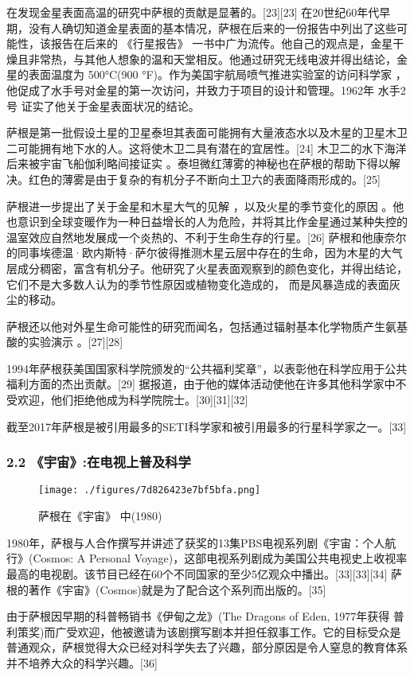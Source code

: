 在发现金星表面高温的研究中萨根的贡献是显著的。[23][23] 在20世纪60年代早期，没有人确切知道金星表面的基本情况，萨根在后来的一份报告中列出了这些可能性，该报告在后来的 《行星报告》 一书中广为流传。他自己的观点是，金星干燥且非常热，与其他人想象的温和天堂相反。他通过研究无线电波并得出结论，金星的表面温度为 500°C(900 °F)。作为美国宇航局喷气推进实验室的访问科学家 ，他促成了水手号对金星的第一次访问，并致力于项目的设计和管理。1962年 水手2号 证实了他关于金星表面状况的结论。

萨根是第一批假设土星的卫星泰坦其表面可能拥有大量液态水以及木星的卫星木卫二可能拥有地下水的人。这将使木卫二具有潜在的宜居性。[24] 木卫二的水下海洋后来被宇宙飞船伽利略间接证实 。泰坦微红薄雾的神秘也在萨根的帮助下得以解决。红色的薄雾是由于复杂的有机分子不断向土卫六的表面降雨形成的。[25]

萨根进一步提出了关于金星和木星大气的见解 ，以及火星的季节变化的原因 。他也意识到全球变暖作为一种日益增长的人为危险，并将其比作金星通过某种失控的温室效应自然地发展成一个炎热的、不利于生命生存的行星。[26] 萨根和他康奈尔的同事埃德温·欧内斯特·萨尔彼得推测木星云层中存在的生命，因为木星的大气层成分稠密，富含有机分子。他研究了火星表面观察到的颜色变化，并得出结论，它们不是大多数人认为的季节性原因或植物变化造成的， 而是风暴造成的表面灰尘的移动。

萨根还以他对外星生命可能性的研究而闻名，包括通过辐射基本化学物质产生氨基酸的实验演示 。[27][28]

1994年萨根获美国国家科学院颁发的“公共福利奖章”，以表彰他在科学应用于公共福利方面的杰出贡献。[29] 据报道，由于他的媒体活动使他在许多其他科学家中不受欢迎，他们拒绝他成为科学院院士。[30][31][32]

截至2017年萨根是被引用最多的SETI科学家和被引用最多的行星科学家之一。[33]
\subsubsection{2.2 《宇宙》:在电视上普及科学}
\begin{figure}[ht]
\centering
\texttt{[image: ./figures/7d826423e7bf5bfa.png]}
\caption{萨根在《宇宙》 中(1980)} \label{fig_Sagan_3}
\end{figure}
1980年，萨根与人合作撰写并讲述了获奖的13集PBS电视系列剧《宇宙：个人航行》(Cosmos: A Personal Voyage)，这部电视系列剧成为美国公共电视史上收视率最高的电视剧。该节目已经在60个不同国家的至少5亿观众中播出。[33][33][34] 萨根的著作《宇宙》(Cosmos)就是为了配合这个系列而出版的。[35]

由于萨根因早期的科普畅销书《伊甸之龙》(The Dragons of Eden, 1977年获得 普利策奖)而广受欢迎，他被邀请为该剧撰写剧本并担任叙事工作。它的目标受众是普通观众，萨根觉得大众已经对科学失去了兴趣，部分原因是令人窒息的教育体系并不培养大众的科学兴趣。[36]

